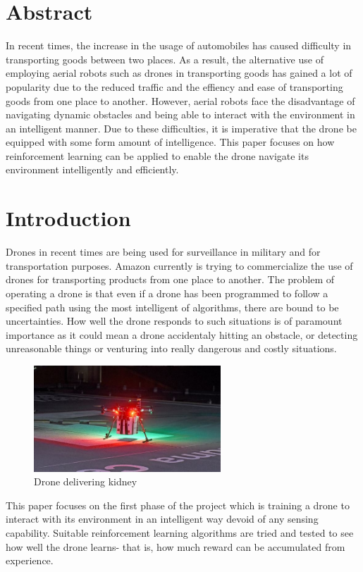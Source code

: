 \documentclass[12pt]{article}
\begin{document}

\tableofcontents
\pagebreak

\section{Abstract}
In recent times, the increase in the usage of automobiles has caused difficulty in transporting goods between two places.
As a result, the alternative use of employing aerial robots such as drones in transporting goods has gained a lot of popularity
due to the reduced traffic and the effiency and ease of transporting goods from one place to another. 
However, aerial robots face the disadvantage of navigating dynamic obstacles  and being able to interact with the environment in an intelligent 
manner. Due to these difficulties, it is imperative that the drone be equipped with some form amount of intelligence. This paper focuses on how
reinforcement learning can be applied to enable the drone navigate its environment intelligently and efficiently.

\section{Introduction}
Drones in recent times are being used for surveillance in military and for transportation purposes. Amazon currently is trying to commercialize
the use of drones for transporting products from one place to another. The problem of operating a drone is that even if a drone has been 
programmed to follow a specified path using the most intelligent of algorithms, there are bound to be uncertainties. How well the drone responds 
to such situations is of paramount importance as it could mean a drone accidentaly hitting an obstacle, or detecting unreasonable things or
venturing into really dangerous and costly situations.

\begin{figure}[h]
    \centering
    \includegraphics[width=7cm]{kidney}
    \caption{Drone delivering kidney}
    \label{fig:Drone delivering kidney}
\end{figure}
This paper focuses on the first phase of the project which is training a drone to interact with its environment in an intelligent way devoid of 
any sensing capability. Suitable reinforcement learning algorithms are tried and tested to see how well the drone learns- that is, how much reward
can be accumulated from experience. 
\end{document}
